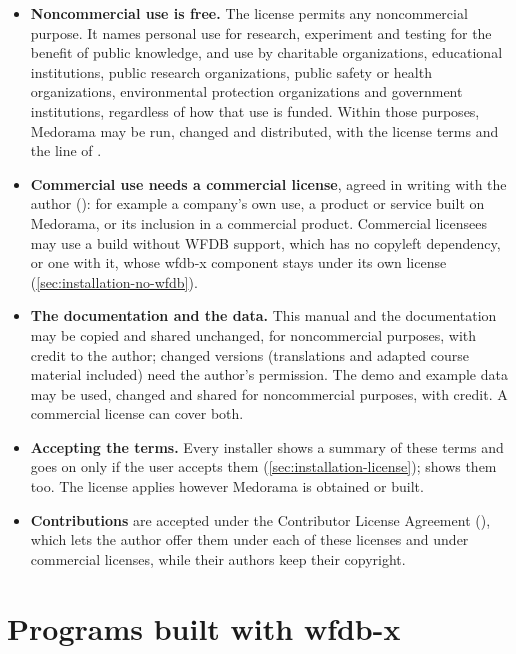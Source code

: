 \begin{itemize}
\item \textbf{Noncommercial use is free.} The license permits any noncommercial purpose. It names
  personal use for research, experiment and testing for the benefit of public knowledge, and use
  by charitable organizations, educational institutions, public research organizations, public
  safety or health organizations, environmental protection organizations and government
  institutions, regardless of how that use is funded. Within those purposes, Medorama may be
  run, changed and distributed, with the license terms and the  line of
  .
\item \textbf{Commercial use needs a commercial license}, agreed in writing with the author
  (): for example a company's own use, a product or service built on
  Medorama, or its inclusion in a commercial product. Commercial licensees may use a build
  without WFDB support, which has no copyleft dependency, or one with it, whose wfdb-x component
  stays under its own license (\cref{sec:installation-no-wfdb}).
\item \textbf{The documentation and the data.} This manual and the documentation may be copied
  and shared unchanged, for noncommercial purposes, with credit to the author; changed versions
  (translations and adapted course material included) need the author's permission. The demo
  and example data may be used, changed and shared for noncommercial purposes, with credit. A
  commercial license can cover both.
\item \textbf{Accepting the terms.} Every installer shows a summary of these terms and goes on
  only if the user accepts them (\cref{sec:installation-license});  shows
  them too. The license applies however Medorama is obtained or built.
\item \textbf{Contributions} are accepted under the Contributor License Agreement
  (), which lets the author offer them under each of these licenses and under
  commercial licenses, while their authors keep their copyright.
\end{itemize}

\section{Programs built with wfdb-x}
\label{sec:licences-wfdbx}

